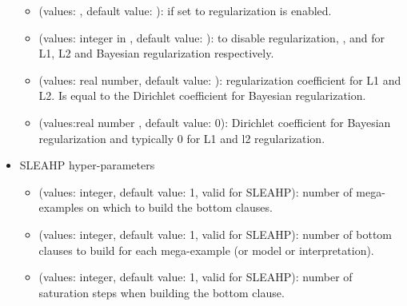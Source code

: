 \documentclass[letterpaper,10pt,english]{sphinxmanual}
\begin{document}
\begin{itemize}
\begin{itemize}
\item {} 
 (values:  , default value: ): if set to  regularization is enabled.

\item {} 
 (values: integer in \sphinxcode{\sphinxupquote{{[}0,3{]}}} , default value: ):   to disable regularization, ,  and  for L1, L2 and Bayesian regularization respectively.

\item {} 
 (values: real number, default value: ): regularization coefficient for L1 and L2. Is equal to the Dirichlet coefficient  for Bayesian regularization.

\item {} 
 (values:real number , default value: 0): Dirichlet coefficient  for Bayesian regularization and typically 0 for L1 and l2 regularization.

\end{itemize}

\item {} 
SLEAHP hyper-parameters
\begin{itemize}
\item {} 
 (values: integer, default value: 1, valid for SLEAHP): number of mega-examples on which to build the bottom clauses.

\item {} 
 (values: integer, default value: 1, valid for SLEAHP): number of bottom clauses to build for each mega-example (or model or interpretation).

\item {} 
 (values: integer, default value: 1, valid for SLEAHP): number of saturation steps when building the bottom clause.


\end{itemize}
\end{itemize}
\end{document}

